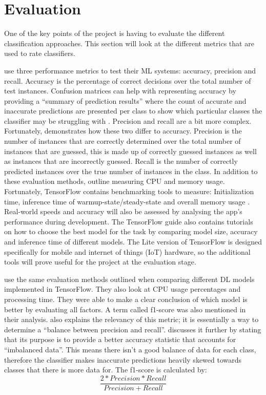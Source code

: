 \documentclass[12pt,a4paper]{report}
\begin{document}
\section{Evaluation}
\label{subsec:evaluation}

One of the key points of the project is having to evaluate the different classification approaches. This section will
look at the different metrics that are used to rate classifiers.

\par

\citet{10.1145/1163593.1163596} use three performance metrics to test their ML systems: accuracy, precision and recall. 
Accuracy 
is the percentage of correct decisions over the total number of test instances. Confusion matrices can help with 
representing accuracy by providing a “summary of prediction results” where the count of accurate and inaccurate 
predictions are presented per class to show which particular classes the classifier may be struggling with \citep{Brownlee2020b}. 
Precision and recall are a bit more complex. 
Fortunately, \citet{shung2018} demonstrates how these two differ to accuracy. Precision is the number of 
instances that are correctly determined over the total number of instances that are guessed, this is made up of 
correctly guessed instances as well as instances that are incorrectly guessed. Recall is the number of correctly 
predicted instances over the true number of instances in the class. In addition to these evaluation methods, 
\citet{10.1145/1163593.1163596} outline measuring CPU and memory usage. Fortunately, TensorFlow
contains benchmarking tools to measure: Initialization time, inference time of warmup-state/steady-state and overall 
memory usage \citep{googleTF}. Real-world speeds and accuracy will also be assessed by analysing the app's performance 
during development. The TensorFlow guide also contains tutorials on 
how to choose the best model for the task by comparing model size, accuracy and inference time of different models.
The Lite version of TensorFlow is designed specifically for mobile and internet of things (IoT) 
hardware, so the additional tools will prove useful for the project at the evaluation stage.

\par

\citet{Chockwanich} use the same evaluation methods outlined when comparing different DL models 
implemented in TensorFlow. They also look at CPU usage percentages and processing time. They were able to make a clear 
conclusion of which model is better by evaluating all factors. A term called f1-score was also mentioned in their 
analysis. \citet{shung2018} also explains the relevancy of this metric; it is essentially a way to determine a “balance between
precision and recall”. \citet{kors2021} discusses it further by stating that its purpose is to provide a better 
accuracy statistic that accounts for “imbalanced data”. This means there isn't a good balance of data for each 
class, therefore the classifier makes inaccurate predictions heavily skewed towards classes that there is more data for. 
The f1-score is calculated by:
\[\frac{2*Precision*Recall}{Precision + Recall}\]
\end{document}
